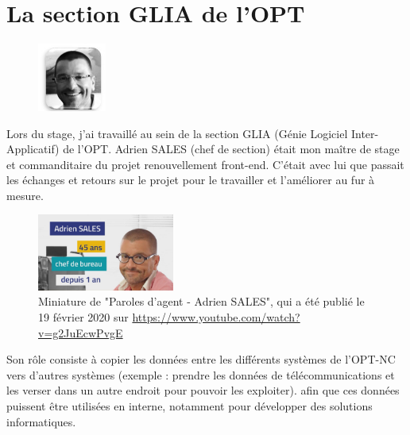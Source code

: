 \documentclass[12pt,a4paper]{report}
\begin{document}
\section{La section GLIA de l'OPT}
\begin{figure}[h] %
    \centering
    \includegraphics[width=0.2\textwidth]{ressources_rapport/adrien_sales.jpg}
\end{figure}
Lors du stage, j'ai travaillé au sein de la section GLIA (Génie Logiciel Inter-Applicatif) de l'OPT. Adrien SALES (chef de section) était mon maître de stage et commanditaire du projet renouvellement front-end. C'était avec lui que passait les échanges et retours sur le projet pour le travailler et l'améliorer au fur à mesure.

\cite{paroles_agent}

\vspace{1cm}
\begin{figure}[h] %
    \centering
    \includegraphics[width=0.4\textwidth]{ressources_rapport/paroles_agent.jpg}
    \caption{Miniature de "Paroles d'agent - Adrien SALES", qui a été publié le 19 février 2020 sur \href{https://www.youtube.com/watch?v=g2JuEcwPvgE}{https://www.youtube.com/watch?v=g2JuEcwPvgE}}
\end{figure}
Son rôle consiste à copier les données entre les différents systèmes de l'OPT-NC vers d'autres systèmes (exemple : prendre les données de télécommunications et les verser dans un autre endroit pour pouvoir les exploiter). afin que ces données puissent être utilisées en interne, notamment \cite{serie_articles} pour développer des solutions informatiques.
\newpage
\end{document}
